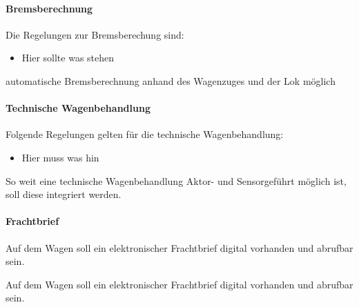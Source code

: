 \paragraph{Bremsberechnung}\par
Die Regelungen zur Bremsberechung sind:
\begin{itemize}
    \item Hier sollte was stehen
\end{itemize}
\begin{feat}
automatische Bremsberechnung anhand des Wagenzuges und der Lok möglich
\end{feat}

\paragraph{Technische Wagenbehandlung}\par
Folgende Regelungen gelten für die technische Wagenbehandlung:
\begin{itemize}
    \item Hier muss was hin
\end{itemize}
\begin{feat}
So weit eine technische Wagenbehandlung Aktor- und Sensorgeführt möglich ist, soll diese integriert werden.
\end{feat}

\paragraph{Frachtbrief}\par
Auf dem Wagen soll ein elektronischer Frachtbrief digital vorhanden und abrufbar sein.
\begin{feat}
Auf dem Wagen soll ein elektronischer Frachtbrief digital vorhanden und abrufbar sein.
\end{feat}

